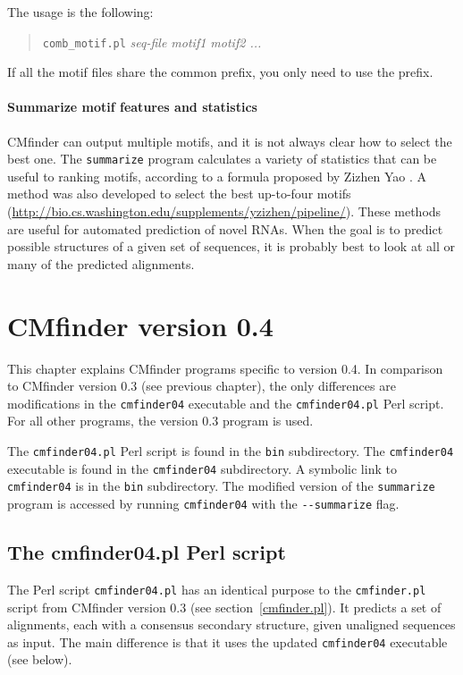 \documentclass[letterpaper,12pt]{report}
\begin{document}
The usage is the following:

\begin{quote}
{\tt comb\_motif.pl} {\it seq-file motif1 motif2 ...}
\end{quote}

If all the motif files share the common prefix, you only need to use the prefix.

\subsubsection{Summarize motif features and statistics}

CMfinder can output multiple motifs, and it is not always clear how to select the best one. 
The {\tt summarize} program calculates a variety of statistics that can be useful to ranking motifs, according to a formula proposed by Zizhen Yao \cite{ZizhenThesis}.  A method was also developed to select the best up-to-four motifs (\url{http://bio.cs.washington.edu/supplements/yzizhen/pipeline/}).  These methods are useful for automated prediction of novel RNAs.  When the goal is to predict possible structures of a given set of sequences, it is probably best to look at all or many of the predicted alignments.

\chapter{CMfinder version 0.4}

This chapter explains CMfinder programs specific to version 0.4.  In comparison to CMfinder version 0.3 (see previous chapter), the only differences are modifications in the {\tt cmfinder04} executable and the {\tt cmfinder04.pl} Perl script.  For all other programs, the version 0.3 program is used.

The {\tt cmfinder04.pl} Perl script is found in the {\tt bin} subdirectory.  The {\tt cmfinder04} executable is found in the {\tt cmfinder04} subdirectory.  A symbolic link to {\tt cmfinder04} is in the {\tt bin} subdirectory.  The modified version of the {\tt summarize} program is accessed by running {\tt cmfinder04} with the {\tt -{}-summarize} flag.

\section{The cmfinder04.pl Perl script}

The Perl script {\tt cmfinder04.pl} has an identical purpose to the {\tt cmfinder.pl} script from CMfinder version 0.3 (see section~\ref{cmfinder.pl}).  It predicts a set of alignments, each with a consensus secondary structure, given unaligned sequences as input.  The main difference is that it uses the updated {\tt cmfinder04} executable (see below).
\end{document}
